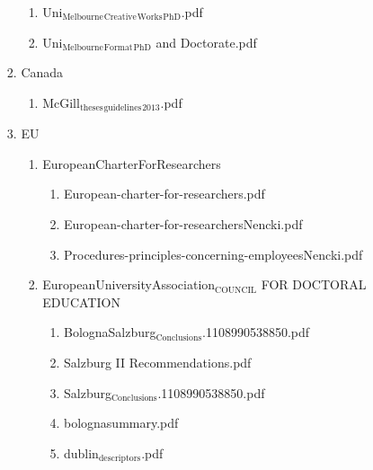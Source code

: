 \documentclass[11pt]{article}
\begin{document}
\begin{enumerate}
\begin{enumerate}
\begin{enumerate}
\begin{enumerate}
\item Uni$_{\text{Melbourne}}$$_{\text{Creative}}$$_{\text{Works}}$$_{\text{PhD}}$.pdf
\label{sec-1-1-1-1-8-8-13-1-2}

\item Uni$_{\text{Melbourne}}$$_{\text{Format}}$$_{\text{PhD}}$ and Doctorate.pdf
\label{sec-1-1-1-1-8-8-13-1-3}
\end{enumerate}

\item Canada
\label{sec-1-1-1-1-8-8-13-2}
\begin{enumerate}
\item McGill$_{\text{theses}}$$_{\text{guidelines}}$$_{\text{2013}}$.pdf
\label{sec-1-1-1-1-8-8-13-2-1}
\end{enumerate}

\item EU
\label{sec-1-1-1-1-8-8-13-3}
\begin{enumerate}
\item EuropeanCharterForResearchers
\label{sec-1-1-1-1-8-8-13-3-1}
\begin{enumerate}
\item European-charter-for-researchers.pdf
\label{sec-1-1-1-1-8-8-13-3-1-1}

\item European-charter-for-researchersNencki.pdf
\label{sec-1-1-1-1-8-8-13-3-1-2}

\item Procedures-principles-concerning-employeesNencki.pdf
\label{sec-1-1-1-1-8-8-13-3-1-3}
\end{enumerate}

\item EuropeanUniversityAssociation$_{\text{COUNCIL}}$ FOR DOCTORAL EDUCATION
\label{sec-1-1-1-1-8-8-13-3-2}
\begin{enumerate}
\item BolognaSalzburg$_{\text{Conclusions}}$.1108990538850.pdf
\label{sec-1-1-1-1-8-8-13-3-2-1}

\item Salzburg II Recommendations.pdf
\label{sec-1-1-1-1-8-8-13-3-2-2}

\item Salzburg$_{\text{Conclusions}}$.1108990538850.pdf
\label{sec-1-1-1-1-8-8-13-3-2-3}

\item bolognasummary.pdf
\label{sec-1-1-1-1-8-8-13-3-2-4}

\item dublin$_{\text{descriptors}}$.pdf
\label{sec-1-1-1-1-8-8-13-3-2-5}
\end{enumerate}
\end{enumerate}


\end{enumerate}
\end{enumerate}
\end{enumerate}
\end{document}
